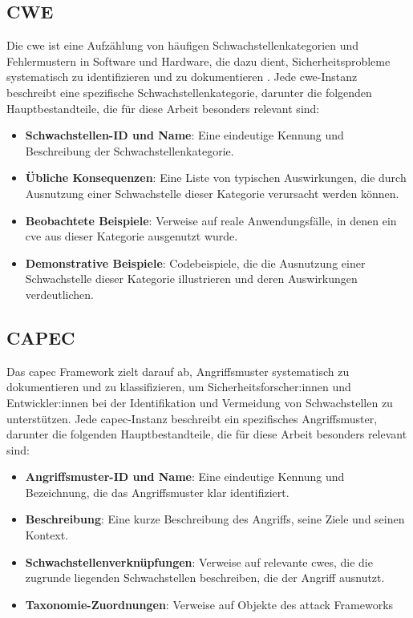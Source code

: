\subsection{CWE}
\label{bg:cwe}
Die \gls{cwe} ist eine Aufzählung von häufigen Schwachstellenkategorien und Fehlermustern in Software und Hardware, die dazu dient, Sicherheitsprobleme systematisch zu identifizieren und zu dokumentieren \autocite{CWEWebsite}. Jede \gls{cwe}-Instanz beschreibt eine spezifische Schwachstellenkategorie, darunter die folgenden Hauptbestandteile, die für diese Arbeit besonders relevant sind:

\begin{itemize}
    \item \textbf{Schwachstellen-ID und Name}: Eine eindeutige Kennung und Beschreibung der Schwachstellenkategorie.
    \item \textbf{Übliche Konsequenzen}: Eine Liste von typischen Auswirkungen, die durch Ausnutzung einer Schwachstelle dieser Kategorie verursacht werden können.
    \item \textbf{Beobachtete Beispiele}: Verweise auf reale Anwendungsfälle, in denen ein \gls{cve} aus dieser Kategorie ausgenutzt wurde.
    \item \textbf{Demonstrative Beispiele}: Codebeispiele, die die Ausnutzung einer Schwachstelle dieser Kategorie illustrieren und deren Auswirkungen verdeutlichen.
\end{itemize}

\subsection{CAPEC}
\label{bg:capec}
Das \gls{capec} Framework zielt darauf ab, Angriffsmuster systematisch zu dokumentieren und zu klassifizieren, um Sicherheitsforscher:innen und Entwickler:innen bei der Identifikation und Vermeidung von Schwachstellen zu unterstützen. Jede \gls{capec}-Instanz beschreibt ein spezifisches Angriffsmuster, darunter die folgenden Hauptbestandteile, die für diese Arbeit besonders relevant sind:

\begin{itemize}
    \item \textbf{Angriffsmuster-ID und Name}: Eine eindeutige Kennung und Bezeichnung, die das Angriffsmuster klar identifiziert.
    \item \textbf{Beschreibung}: Eine kurze Beschreibung des Angriffs, seine Ziele und seinen Kontext.
    \item \textbf{Schwachstellenverknüpfungen}: Verweise auf relevante \glspl{cwe}, die die zugrunde liegenden Schwachstellen beschreiben, die der Angriff ausnutzt.
    \item \textbf{Taxonomie-Zuordnungen}: Verweise auf Objekte des \gls{attack} Frameworks
\end{itemize}

